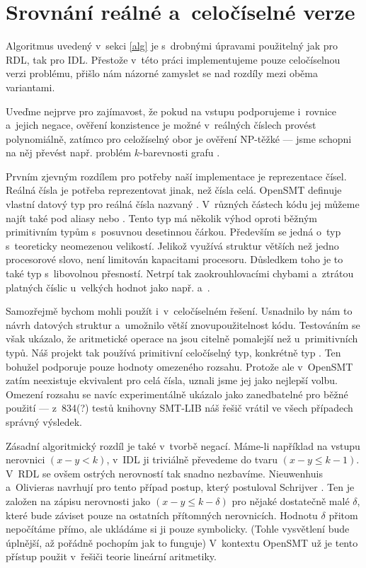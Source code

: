 \section{Srovnání reálné a~celočíselné verze} \label{int_v_real}

Algoritmus uvedený v~sekci \ref{alg} je s~drobnými úpravami použitelný jak pro RDL, tak pro IDL. Přestože v~této práci implementujeme pouze celočíselnou verzi problému, přišlo nám názorné zamyslet se nad rozdíly mezi oběma variantami.

Uveďme nejprve pro zajímavost, že pokud na vstupu podporujeme i~rovnice a~jejich negace, ověření konzistence je možné v~reálných číslech provést polynomiálně, zatímco pro celožíselný obor je ověření NP-těžké --- jsme schopni na něj převést např. problém $k$-barevnosti grafu \cite{slides}.

Prvním zjevným rozdílem pro potřeby naší implementace je reprezentace čísel. Reálná čísla je potřeba reprezentovat jinak, než čísla celá. OpenSMT definuje vlastní datový typ pro reálná čísla nazvaný . V~různých částech kódu jej můžeme najít také pod aliasy  nebo . Tento typ má několik výhod oproti běžným primitivním typům s~posuvnou desetinnou čárkou. Především se jedná o~typ s~teoreticky neomezenou velikostí. Jelikož využívá struktur větších než jedno procesorové slovo, není limitován kapacitami procesoru. Důsledkem toho je to také typ s~libovolnou přesností. Netrpí tak zaokrouhlovacími chybami a~ztrátou platných číslic u~velkých hodnot jako např.  a~.

Samozřejmě bychom mohli  použít i~v~celočíselném řešení. Usnadnilo by nám to návrh datových struktur a~umožnilo větší znovupoužitelnost kódu. Testováním se však ukázalo, že aritmetické operace na  jsou citelně pomalejší než u~primitivních typů. Náš projekt tak používá primitivní celočíselný typ, konkrétně typ . Ten bohužel podporuje pouze hodnoty omezeného rozsahu. Protože ale v~OpenSMT zatím neexistuje ekvivalent  pro celá čísla, uznali jsme jej jako nejlepší volbu. Omezení rozsahu se navíc experimentálně ukázalo jako zanedbatelné pro běžné použití --- z~834(?) %
testů knihovny SMT-LIB náš řešič vrátil ve všech případech správný výsledek.

Zásadní algoritmický rozdíl je také v~tvorbě negací. Máme-li například na vstupu nerovnici $(x-y<k)$, v~IDL ji triviálně převedeme do tvaru $(x-y\leq k-1)$. V~RDL se ovšem ostrých nerovností tak snadno nezbavíme. Nieuwenhuis a~Olivieras \cite{Nieuwenhuis05} navrhují pro tento případ postup, který postuloval Schrijver \cite{Schrijver86}. Ten je založen na zápisu nerovnosti jako $(x-y\leq k-\delta)$ pro nějaké dostatečně malé $\delta$, které bude záviset pouze na ostatních přítomných nerovnicích. Hodnotu $\delta$ přitom nepočítáme přímo, ale ukládáme si ji pouze symbolicky. (Tohle vysvětlení bude úplnější, až pořádně pochopím jak to funguje) %
V~kontextu OpenSMT už je tento přístup použit v~řešiči teorie lineární aritmetiky.

